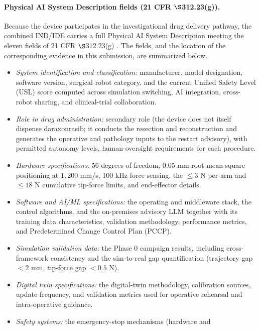 
\paragraph{Physical AI System Description fields (21 CFR $\S$312.23(g)).}
Because the device participates in the investigational drug delivery pathway, the
combined IND/IDE carries a full Physical AI System Description meeting the eleven
fields of 21 CFR $\S$312.23(g) \cite{kawchak2026adapt312}. The fields, and the
location of the corresponding evidence in this submission, are summarized below.

\begin{itemize}[leftmargin=1.4em,itemsep=1pt,topsep=2pt]
\item[(i)] \textit{System identification and classification:} manufacturer, model
designation, software version, surgical robot category, and the current Unified
Safety Level (USL) score computed across simulation switching, AI integration,
cross-robot sharing, and clinical-trial collaboration.
\item[(ii)] \textit{Role in drug administration:} secondary role (the device does
not itself dispense daraxonrasib; it conducts the resection and reconstruction and
generates the operative and pathology inputs to the restart advisory), with permitted autonomy levels, human-oversight requirements for each procedure.
\item[(iii)] \textit{Hardware specifications:} 56 degrees of freedom, 0.05 mm root
mean square positioning at $1{,}200$ mm/s, 100 kHz force sensing, the $\leq 3$ N
per-arm and $\leq 18$ N cumulative tip-force limits, and end-effector details.
\item[(iv)] \textit{Software and AI/ML specifications:} the operating and
middleware stack, the control algorithms, and the on-premises advisory LLM
together with its training data characteristics, validation methodology,
performance metrics, and Predetermined Change Control Plan (PCCP).
\item[(v)] \textit{Simulation validation data:} the Phase 0 campaign results,
including cross-framework consistency and the sim-to-real gap quantification
(trajectory gap $< 2$ mm, tip-force gap $< 0.5$ N).
\item[(vi)] \textit{Digital twin specifications:} the digital-twin methodology,
calibration sources, update frequency, and validation metrics used for operative
rehearsal and intra-operative guidance.
\item[(vii)] \textit{Safety systems:} the emergency-stop mechanisms (hardware and

\end{itemize}
